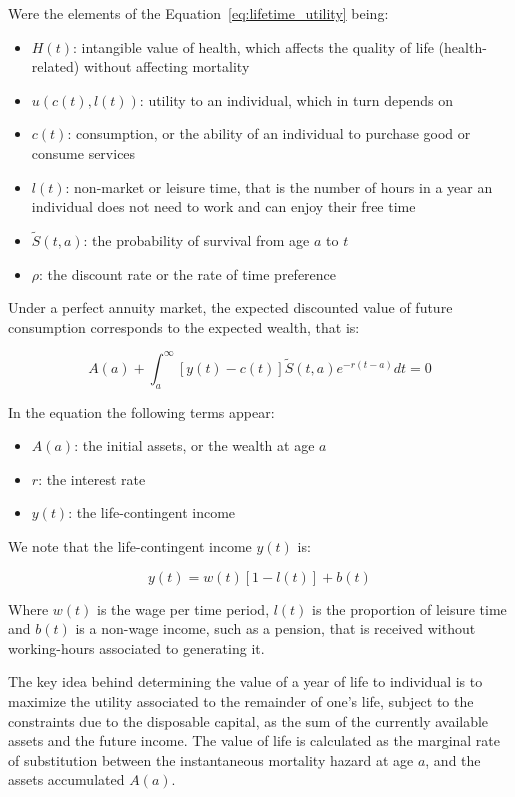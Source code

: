 Were the elements of the Equation~\eqref{eq:lifetime_utility} being:

\begin{itemize}
    \item $H(t)$: intangible value of health, which affects the quality of life (health-related) without affecting mortality
    \item $u(c(t), l(t))$: utility to an individual, which in turn depends on
    \item $c(t)$: consumption, or the ability of an individual to purchase good or consume services
    \item $l(t)$: non-market or leisure time, that is the number of hours in a year an individual does not need to work and can enjoy their free time
    \item $\widetilde{S}(t,a)$: the probability of survival from age $a$ to $t$
    \item $\rho$: the discount rate or the rate of time preference
\end{itemize}

Under a perfect annuity market, the expected discounted value of future consumption corresponds to the expected wealth\cite{Murphy2006}, that is:

\begin{equation}\label{eq:expected_wealth}
A(a) + \int_{a}^{\infty}{\left\lbrack y(t) - c(t) \right\rbrack\widetilde{S}(t,a)e^{- r(t - a)}dt = 0}
\end{equation}

In the equation the following terms appear:
\begin{itemize}
    \item $A(a)$: the initial assets, or the wealth at age $a$
    \item $r$: the interest rate
    \item $y(t)$: the life-contingent income
\end{itemize}

We note that the life-contingent income $y(t)$ is:

\begin{equation}\label{eq:income}
y(t) = w(t)\left\lbrack 1 - l(t) \right\rbrack + b(t)
\end{equation}

Where $w(t)$ is the wage per time period, $l(t)$ is the proportion of leisure time and $b(t)$ is a non-wage income, such as a pension, that is received without working-hours associated to generating it.

The key idea behind determining the value of a year of life to individual is to maximize the utility associated to the remainder of one's life, subject to the constraints due to the disposable capital, as the sum of the currently available assets and the future income. The value of life is calculated as the marginal rate of substitution between the instantaneous mortality hazard at age $a$, and the assets accumulated $A(a)$.

